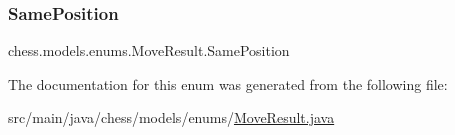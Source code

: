 \subsubsection{\texorpdfstring{Same\+Position}{SamePosition}}
{\footnotesize\ttfamily chess.\+models.\+enums.\+Move\+Result.\+Same\+Position}



The documentation for this enum was generated from the following file\+:\begin{DoxyCompactItemize}
\item 
src/main/java/chess/models/enums/\mbox{\hyperlink{_move_result_8java}{Move\+Result.\+java}}\end{DoxyCompactItemize}
